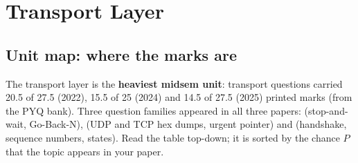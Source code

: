 \chapter{Transport Layer}
\label{ch:transport}

\section*{Unit map: where the marks are}
The transport layer is the \textbf{heaviest midsem unit}: transport questions carried 20.5 of 27.5 (2022), 15.5 of 25 (2024) and 14.5 of 27.5 (2025) printed marks (from the PYQ bank).
Three question families appeared in all three papers:  (stop-and-wait, Go-Back-N),
 (UDP and TCP hex dumps, urgent pointer) and  (handshake, sequence numbers, states).
Read the table top-down; it is sorted by the chance $P$ that the topic appears in your paper.

